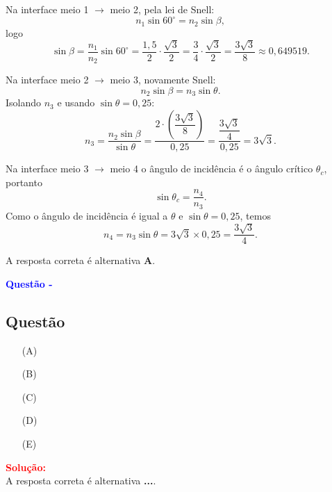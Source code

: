 \begin{flushleft}
Na interface meio 1 $\to$ meio 2, pela lei de Snell:
\[
n_1\sin 60^\circ = n_2\sin\beta,
\]
logo
\[
\sin\beta=\frac{n_1}{n_2}\sin60^\circ=\frac{1{,}5}{2}\cdot\frac{\sqrt{3}}{2}
=\frac{3}{4}\cdot\frac{\sqrt{3}}{2}=\frac{3\sqrt{3}}{8}\approx 0{,}649519.
\]

Na interface meio 2 $\to$ meio 3, novamente Snell:
\[
n_2\sin\beta = n_3\sin\theta.
\]
Isolando $n_3$ e usando $\sin\theta=0{,}25$:
\[
n_3=\frac{n_2\sin\beta}{\sin\theta}
= \frac{2\cdot\left(\dfrac{3\sqrt{3}}{8}\right)}{0{,}25}
= \frac{\dfrac{3\sqrt{3}}{4}}{0{,}25}
= 3\sqrt{3}.
\]

Na interface meio 3 $\to$ meio 4 o ângulo de incidência é o ângulo crítico $\theta_c$, portanto
\[
\sin\theta_c=\frac{n_4}{n_3}.
\]
Como o ângulo de incidência é igual a $\theta$ e $\sin\theta=0{,}25$, temos
\[
n_4 = n_3\sin\theta = 3\sqrt{3}\times 0{,}25 = \frac{3\sqrt{3}}{4}.
\]

A resposta correta é alternativa \colorbox{green!50}{\textbf{A}}.

\end{flushleft}


\begin{flushleft}
\textbf{\textcolor{blue}{\Large Quest\~ao - }}\\
\noindent

\subsection{Quest\~ao }

\begin{itemize}
\item[(A)] 
\item[(B)] 
\item[(C)]
\item[(D)] 
\item[(E)] 
\end{itemize}

\vspace{0.5cm}

\textcolor{red}{\textbf{Solução:}}\\


A resposta correta é alternativa \colorbox{green!50}{\textbf{...}}.

\end{flushleft}